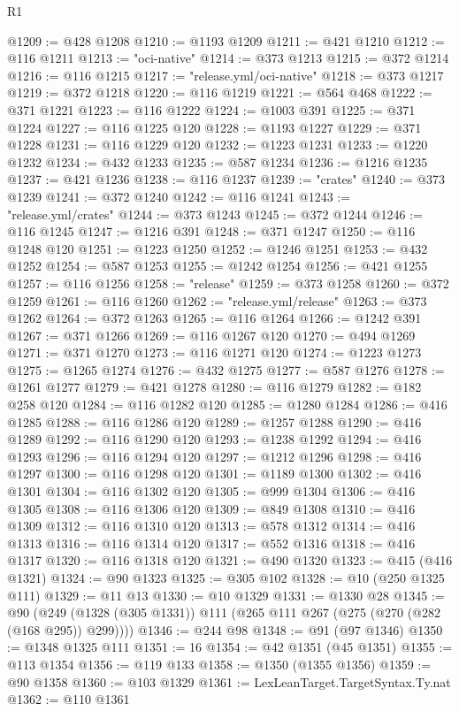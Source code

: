 \begin{lexlean}{R1}
\begin{coremodule}
@1209 := @428 @1208
@1210 := @1193 @1209
@1211 := @421 @1210
@1212 := @116 @1211
@1213 := "oci-native"
@1214 := @373 @1213
@1215 := @372 @1214
@1216 := @116 @1215
@1217 := "release.yml/oci-native"
@1218 := @373 @1217
@1219 := @372 @1218
@1220 := @116 @1219
@1221 := @564 @468
@1222 := @371 @1221
@1223 := @116 @1222
@1224 := @1003 @391
@1225 := @371 @1224
@1227 := @116 @1225 @120
@1228 := @1193 @1227
@1229 := @371 @1228
@1231 := @116 @1229 @120
@1232 := @1223 @1231
@1233 := @1220 @1232
@1234 := @432 @1233
@1235 := @587 @1234
@1236 := @1216 @1235
@1237 := @421 @1236
@1238 := @116 @1237
@1239 := "crates"
@1240 := @373 @1239
@1241 := @372 @1240
@1242 := @116 @1241
@1243 := "release.yml/crates"
@1244 := @373 @1243
@1245 := @372 @1244
@1246 := @116 @1245
@1247 := @1216 @391
@1248 := @371 @1247
@1250 := @116 @1248 @120
@1251 := @1223 @1250
@1252 := @1246 @1251
@1253 := @432 @1252
@1254 := @587 @1253
@1255 := @1242 @1254
@1256 := @421 @1255
@1257 := @116 @1256
@1258 := "release"
@1259 := @373 @1258
@1260 := @372 @1259
@1261 := @116 @1260
@1262 := "release.yml/release"
@1263 := @373 @1262
@1264 := @372 @1263
@1265 := @116 @1264
@1266 := @1242 @391
@1267 := @371 @1266
@1269 := @116 @1267 @120
@1270 := @494 @1269
@1271 := @371 @1270
@1273 := @116 @1271 @120
@1274 := @1223 @1273
@1275 := @1265 @1274
@1276 := @432 @1275
@1277 := @587 @1276
@1278 := @1261 @1277
@1279 := @421 @1278
@1280 := @116 @1279
@1282 := @182 @258 @120
@1284 := @116 @1282 @120
@1285 := @1280 @1284
@1286 := @416 @1285
@1288 := @116 @1286 @120
@1289 := @1257 @1288
@1290 := @416 @1289
@1292 := @116 @1290 @120
@1293 := @1238 @1292
@1294 := @416 @1293
@1296 := @116 @1294 @120
@1297 := @1212 @1296
@1298 := @416 @1297
@1300 := @116 @1298 @120
@1301 := @1189 @1300
@1302 := @416 @1301
@1304 := @116 @1302 @120
@1305 := @999 @1304
@1306 := @416 @1305
@1308 := @116 @1306 @120
@1309 := @849 @1308
@1310 := @416 @1309
@1312 := @116 @1310 @120
@1313 := @578 @1312
@1314 := @416 @1313
@1316 := @116 @1314 @120
@1317 := @552 @1316
@1318 := @416 @1317
@1320 := @116 @1318 @120
@1321 := @490 @1320
@1323 := @415 (@416 @1321)
@1324 := @90 @1323
@1325 := @305 @102
@1328 := @10 (@250 @1325 @111)
@1329 := @11 @13
@1330 := @10 @1329
@1331 := @1330 @28
@1345 := @90 (@249 (@1328 (@305 @1331)) @111 (@265 @111 @267 (@275 (@270 (@282 (@168 @295)) @299))))
@1346 := @244 @98
@1348 := @91 (@97 @1346)
@1350 := @1348 @1325 @111
@1351 := 16
@1354 := @42 @1351 (@45 @1351)
@1355 := @113 @1354
@1356 := @119 @133
@1358 := @1350 (@1355 @1356)
@1359 := @90 @1358
@1360 := @103 @1329
@1361 := LexLeanTarget.TargetSyntax.Ty.nat
@1362 := @110 @1361

\end{coremodule}
\end{lexlean}

